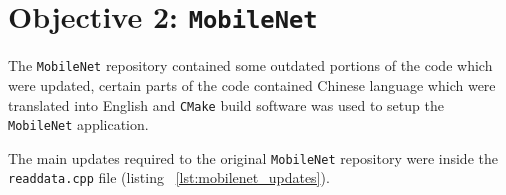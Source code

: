 \begin{table}[h!]
	\centering
	\caption{Mean deadlines missed, results collected from the Raspberry Pi 4.}
	\label{tab:mpbenchmark_rpi4} %
\end{table}

\section{Objective 2: \texttt{MobileNet}}

The \texttt{MobileNet} repository\cite{mobilenet_repo} contained some outdated portions of the code which were updated, certain parts of the code contained Chinese language which were translated into English and \texttt{CMake} build software was used to setup the \texttt{MobileNet} application. 

The main updates required to the original \texttt{MobileNet} repository\cite{mobilenet_repo} were inside the \texttt{readdata.cpp} file (listing ~\ref{lst:mobilenet_updates}). 

